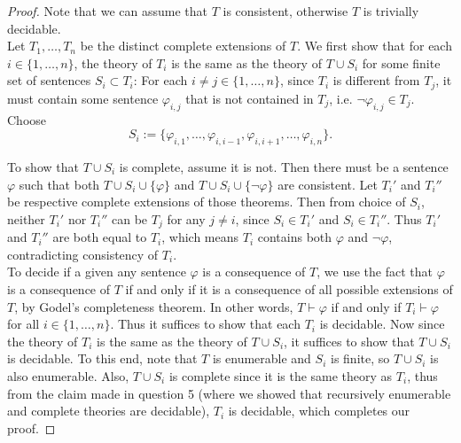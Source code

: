 \documentclass{article}
\begin{document}
\begin{enumerate}[label={\bf Q\arabic*:}]
    \begin{proof}
      Note that we can assume that $T$ is consistent, otherwise $T$ is
      trivially decidable. \\

      Let $T_1,\ldots,T_n$ be the distinct complete extensions of $T$.
      We first show that for each $i\in\{1,\ldots,n\}$, the theory of $T_i$
      is the same as the theory of $T\cup S_i$ for some finite set of
      sentences $S_i\subset T_i$: For each $i\neq j\in\{1,\ldots,n\}$,
      since $T_i$ is different from $T_j$, it must contain some sentence
      $\varphi_{i,j}$ that is not contained in $T_j$, i.e.
      $\neg\varphi_{i,j}\in T_j$. Choose
      \[S_i :=\{\varphi_{i,1},\ldots,\varphi_{i,i-1},
      \varphi_{i,i+1},\ldots,\varphi_{i,n}\}.\]

      To show that $T\cup S_i$ is complete, assume it is not. Then there
      must be a sentence $\varphi$ such that both $T\cup
      S_i\cup\{\varphi\}$ and $T\cup S_i\cup\{\neg\varphi\}$ are
      consistent. Let $T_i'$ and $T_i''$ be respective complete extensions
      of those theorems. Then from choice of $S_i$, neither $T_i'$ nor
      $T_i''$ can be $T_j$ for any $j\neq i$, since $S_i\in T_i'$ and
      $S_i\in T_i''$. Thus $T_i'$ and $T_i''$ are both equal to $T_i$,
      which means $T_i$ contains both $\varphi$ and $\neg\varphi$,
      contradicting consistency of $T_i$. \\

      To decide if a given any sentence $\varphi$ is a consequence of $T$,
      we use the fact that $\varphi$ is a consequence of $T$ if and only if
      it is a consequence of all possible extensions of $T$, by Godel's
      completeness theorem. In other words, $T\vdash\varphi$ if and only if
      $T_i\vdash\varphi$ for all $i\in\{1,\ldots,n\}$. Thus it suffices to
      show that each $T_i$ is decidable. Now since the theory of $T_i$ is
      the same as the theory of $T\cup S_i$, it suffices to show that
      $T\cup S_i$ is decidable. To this end, note that $T$ is enumerable
      and $S_i$ is finite, so $T\cup S_i$ is also enumerable. Also, $T\cup
      S_i$ is complete since it is the same theory as $T_i$, thus from the
      claim made in question 5 (where we showed that recursively enumerable
      and complete theories are decidable), $T_i$ is decidable, which
      completes our proof.
    \end{proof}
\end{enumerate}
\end{document}

